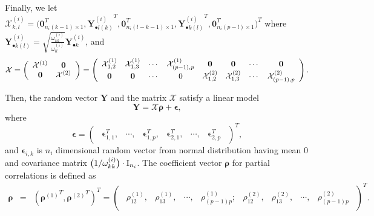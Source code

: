 \documentclass[useAMS,usenatbib,referee]{bio}
\newcommand{\bs}{\boldsymbol}
\begin{document}
{Finally, we let 
$
\mathcal{X}^{(i)}_{k,l}
= \big( \mathbf{0}_{n_i(k-1)\times 1}^{T},
{\mathbf{Y}^{(i)}_{\bullet l(k)}}^T, \mathbf{0}_{n_i(l-k-1)\times 1}^T
, {\mathbf{Y}^{(i)}_{\bullet k(l)}}^T, \mathbf{0}_{n_i(p-l)\times 1}^T
\big)^T
$ where
$\mathbf{Y}^{(i)}_{\bullet k(l)} = \sqrt{\frac{\omega^{(i)}_{kk}}{\omega^{(i)}_{ll}}}
\mathbf{Y}^{(i)}_{\bullet k}$, and
\begin{equation*} \label{xmat}
\mathcal{X}=
\begin{pmatrix}
\begin{array}{cc}
{\mathcal{X} }^{(1)} & {\bf 0}\\
{\bf 0} & {\mathcal{X}}^{(2)}
\end{array}
\end{pmatrix}
=
\begin{pmatrix}
\begin{array}{cccccccc}
 \mathcal{X}_{1,2}^{(1)}&  \mathcal{X}_{1,3}^{(1)}&
 \cdots& \mathcal{X}^{(1)}_{(p-1),p}& {\bf 0}& {\bf 0}&
 \cdots&
 {\bf 0} \\
{\bf 0}&  {\bf 0}&
 \cdots& 0 &\mathcal{X}_{1,2}^{(2)}&  \mathcal{X}_{1,3}^{(2)}&
  \cdots& \mathcal{X}^{(2)}_{(p-1),p}
 \end{array}
 \end{pmatrix}.
\end{equation*}

Then, the random  vector $\mathbf{Y}$ and the matrix $\mathcal{X}$ satisfy a linear model
\begin{equation*} \label{eqn:linear}
\mathbf{Y}= \mathcal{X} \bs{\rho} + \bs{\epsilon,}
\end{equation*}
where
\begin{equation} \nonumber
\bs{\epsilon} =
\begin{pmatrix}
\begin{array}{cccccc}
\bs{\epsilon}_{1,1}^{ T},& \cdots ,&\bs{\epsilon}_{1,p}^{ T}, &
\bs{\epsilon}_{2,1}^{ T} ,& \cdots ,& \bs{\epsilon}_{2,p}^{ T}
\end{array}
\end{pmatrix}^{ T},
\end{equation}
 and $\bs{\epsilon}_{i,k}$ is $n_i$ dimensional random vector from normal distribution having mean $0$ and covariance matrix $\big(1/ \omega^{(i)}_{kk} \big) \cdot {\rm I}_{n_i}$. 
 The coefficient vector $\bs{\rho}$ for partial correlations is defined as
\begin{eqnarray} \nonumber
\bs{\rho}&=& ({\bs{\rho}^{(1)}}^T, {\bs{\rho}^{(2)}}^T)^T =
\begin{pmatrix}
\begin{array}{cccccccc}
 \rho^{(1)}_{12},& \rho^{(1)}_{13},&
 \cdots,& \rho^{(1)}_{(p-1)p};& \rho^{(2)}_{12},& \rho^{(2)}_{13},&
 \cdots,&
\rho^{(2)}_{(p-1)p}
 \end{array}
 \end{pmatrix}^{T}.
\end{eqnarray}


}
\end{document}
